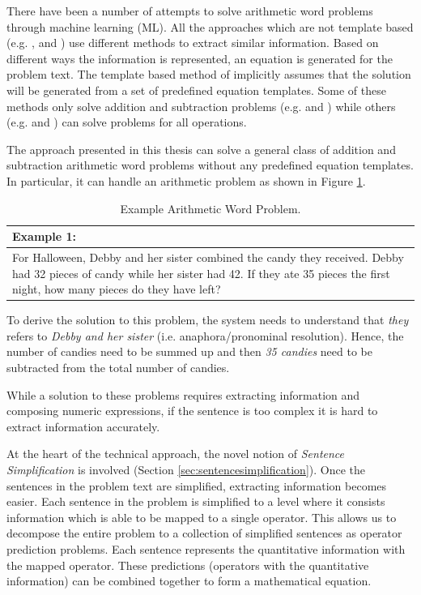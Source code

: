 \documentclass[11pt]{article}
\begin{document}
There have been a number of attempts to solve arithmetic word problems through machine learning (ML). 
All the approaches which are not template based (e.g. \citep{ARIS}, \citep{RoyTACL15} and \citep{RoyR15}) use different methods to extract similar information. Based on different ways the information is represented, an equation is generated for the problem text. The template based method of \citep{Kushman} implicitly assumes that the solution will be generated from a set of predefined equation templates. Some of these methods only solve addition and subtraction problems (e.g. \citep{ARIS} and \citep{RoyTACL15}) while others (e.g. \citep{RoyR15} and \citep{Kushman}) can solve problems for all operations.

The approach presented in this thesis can solve a general class of addition and subtraction arithmetic word problems without any predefined equation templates. In particular, it can handle an arithmetic problem as shown in Figure \ref{figure:1}.

\begin{table}[h!]
\centering
\begin{tabular}{ | m{25em} | }
\hline
\textbf{Example 1:}\\
\hline
For Halloween, Debby and her sister combined the candy they received. Debby had 32 pieces of candy while her sister had 42. If they ate 35 pieces the first night, how many pieces do they have left?\\
\hline
\end{tabular}
\caption{Example Arithmetic Word Problem.}
\label{figure:1}
\end{table}

To derive the solution to this problem, the system needs to understand that \textit{they} refers to \textit{Debby and her sister} (i.e. anaphora/pronominal resolution). Hence, the number of candies need to be summed up and then \textit{35 candies} need to be subtracted from the total number of candies. 

While a solution to these problems requires extracting information and composing numeric expressions, if the sentence is too complex it is hard to extract information accurately.

At the heart of the technical approach, the novel notion of \textit{Sentence Simplification} is involved (Section \ref{sec:sentencesimplification}). Once the sentences in the problem text are simplified, extracting information becomes easier. Each sentence in the problem is simplified to a level where it consists information which is able to be mapped to a single operator. This allows us to decompose the entire problem to a collection of simplified sentences as operator prediction problems. Each sentence represents the quantitative information with the mapped operator. These predictions (operators with the quantitative information) can be combined together to form a mathematical equation.
\end{document}
